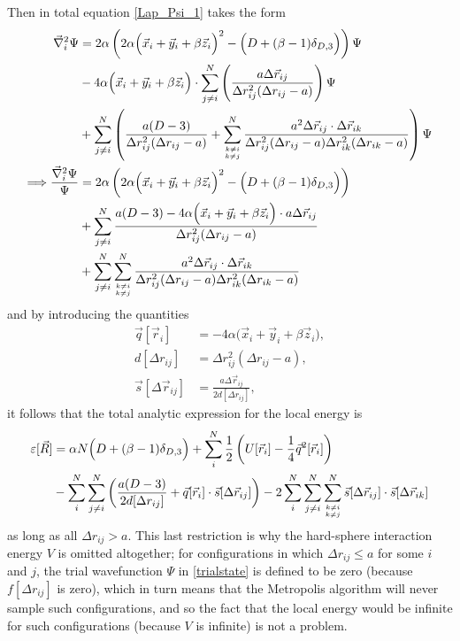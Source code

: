 \documentclass[a4paper,8pt]{article}
\begin{document}
Then in total equation \eqref{Lap_Psi_1} takes the form
\begin{align}
\vec{\nabla}_i^2\Psi &= 2\alpha\left(2\alpha\Big(\vec{x}_i+\vec{y}_i+\beta\vec{z}_i\Big)^2-\Big(D+(\beta-1)\delta_{D,3}\Big)\right) \Psi \nonumber\\
&- 4\alpha\Big(\vec{x}_i+\vec{y}_i+\beta\vec{z}_i\Big) \cdot \sum\limits_{j \neq i}^N \left(\frac{a\Delta\vec{r}_{ij}}{\Delta{r}_{ij}^2(\Delta{r}_{ij}-a)}\right) \Psi \nonumber\\
&+ \sum\limits_{j \neq i}^N \left(\frac{a(D-3)}{\Delta{r}_{ij}^2(\Delta{r}_{ij}-a)} + \sum\limits_{{k \neq i}\atop{k \neq j}}^N \frac{a^2 \Delta\vec{r}_{ij} \cdot \Delta\vec{r}_{ik}}{\Delta{r}_{ij}^2(\Delta{r}_{ij}-a) \Delta{r}_{ik}^2(\Delta{r}_{ik}-a)}\right) \Psi \nonumber\\
\Longrightarrow \frac{\vec{\nabla}_i^2\Psi}{\Psi} &= 2\alpha\left(2\alpha\Big(\vec{x}_i+\vec{y}_i+\beta\vec{z}_i\Big)^2-\Big(D+(\beta-1)\delta_{D,3}\Big)\right) \nonumber\\
&+ \sum\limits_{j \neq i}^N \frac{a(D-3) - 4\alpha\Big(\vec{x}_i+\vec{y}_i+\beta\vec{z}_i\Big) \cdot a\Delta\vec{r}_{ij}}{\Delta{r}_{ij}^2(\Delta{r}_{ij}-a)} \nonumber\\
&+ \sum\limits_{j \neq i}^N \sum\limits_{{k \neq i}\atop{k \neq j}}^N \frac{a^2 \Delta\vec{r}_{ij} \cdot \Delta\vec{r}_{ik}}{\Delta{r}_{ij}^2(\Delta{r}_{ij}-a) \Delta{r}_{ik}^2(\Delta{r}_{ik}-a)}
\end{align}
and by introducing the quantities
\begin{align}
\vec{q}[\vec{r}_i] &= -4\alpha\Big(\vec{x}_i+\vec{y}_i+\beta\vec{z}_i\Big), \label{q}\\
d[\Delta{r}_{ij}] &= \Delta{r}_{ij}^2(\Delta{r}_{ij}-a), \label{d}\\
\vec{s}[\Delta\vec{r}_{ij}] &= \frac{a\Delta\vec{r}_{ij}}{2d[\Delta{r}_{ij}]}, \label{s}
\end{align}
it follows that the total analytic expression for the local energy is
\begin{align}
\varepsilon[\vec{R}] &= \alpha N\Big(D+(\beta-1)\delta_{D,3}\Big) + \sum\limits_i^N \frac{1}{2}\left( U[\vec{r}_i] - \frac{1}{4}\vec{q}^2[\vec{r}_i] \right) \nonumber\\
&- \sum\limits_i^N \sum\limits_{j \neq i}^N \left( \frac{a(D-3)}{2d[\Delta{r}_{ij}]} + \vec{q}[\vec{r}_i] \cdot \vec{s}[\Delta\vec{r}_{ij}] \right) - 2\sum\limits_i^N \sum\limits_{j \neq i}^N \sum\limits_{{k \neq i}\atop{k \neq j}}^N \vec{s}[\Delta\vec{r}_{ij}] \cdot \vec{s}[\Delta\vec{r}_{ik}] \label{compLocalenergy}
\end{align}
as long as all $\Delta r_{ij} > a$. This last restriction is why the hard-sphere interaction energy $V$ is omitted altogether; for configurations in which $\Delta r_{ij} \leq a$ for some $i$ and $j$, the trial wavefunction $\Psi$ in \eqref{trialstate} is defined to be zero (because $f[\Delta r_{ij}]$ is zero), which in turn means that the Metropolis algorithm will never sample such configurations, and so the fact that the local energy would be infinite for such configurations (because $V$ is infinite) is not a problem.
\end{document}
